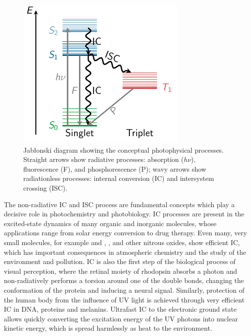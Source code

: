 \documentclass[a4paper,10pt,DIV=15,openany,twoside=false]{scrbook}
\begin{document}
\begin{figure}[!ht]
  \centering
  \includegraphics[scale=1.6]{img/jablonski/jablonski.pdf}
  \caption{Jab{\l}onski diagram showing the conceptual photophysical processes. Straight arrows show radiative processes: absorption ($h\nu$), fluorescence (F), and phosphorescence (P); wavy arrows show radiationless processes: internal conversion (IC) and intersystem crossing (ISC). }
  \label{fig:jablonski}
\end{figure}

The non-radiative IC and ISC process are fundamental concepts which play a decisive role in photochemistry and photobiology. IC processes are present in the excited-state dynamics of many organic and inorganic molecules, whose applications range from solar energy conversion to drug therapy. Even many, very small molecules, for example  and , ,  and other nitrous oxides, show efficient IC, which has important consequences in atmospheric chemistry and the study of the environment and pollution. IC is also the first step of the biological process of visual perception, where the retinal moiety of rhodopsin absorbs a photon and non-radiatively performs a torsion around one of the double bonds, changing the conformation of the protein and inducing a neural signal. Similarly, protection of the human body from the influence of UV light is achieved through very efficient IC in DNA, proteins and melanins. Ultrafast IC to the electronic ground state allows quickly converting the excitation energy of the UV photons into nuclear kinetic energy, which is spread harmlessly as heat to the environment.
\end{document}
